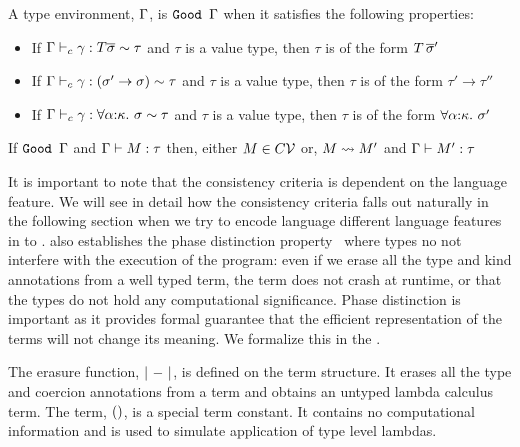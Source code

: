 \documentclass[screen,nonacm,manuscript,review]{acmart} %
\begin{document}
\begin{definition}[$\Good\TEnv$]
 A type environment, $\Gamma$, is $\Good\TEnv$ when it satisfies the
 following properties:
 \begin{itemize}
 \item If $\Gamma \vdash_{c} \gamma : T \overline{\sigma} \sim \tau$ and $\tau$
   is a value type, then $\tau$ is of the form $T\,\overline{\sigma}'$
 \item If $\Gamma \vdash_{c} \gamma : (\sigma' \to \sigma) \sim \tau$ and
   $\tau$ is a value type, then $\tau$ is of the form $\tau' \to \tau''$
 \item If $\Gamma \vdash_{c} \gamma : \forall\alpha{:}\kappa.~\sigma \sim
     \tau$ and $\tau$ is a value type, then $\tau$ is of the form
   $\forall\alpha{:}\kappa.~\sigma'$
 \end{itemize}
\end{definition}

\begin{theorem}\label{thm:progress-sfc}
 If $\Good \TEnv$ and $\Gamma \vdash M : \tau$ then, either $M \in
 C\mathcal{V}$ or, $M \rightsquigarrow M'$ and $\Gamma \vdash M' : \tau$
\end{theorem}

It is important to note that the consistency criteria is
dependent on the language feature. We will see in detail
how the consistency criteria falls out naturally in the following
section when we try to encode language different language features in to
\SFC.  also establishes the phase distinction
property~\cite{harper_higher-order_1989} where types no not
interfere with the execution of the program: even if we erase all the
type and kind annotations from a well typed term, the term does not
crash at runtime, or that the types do not hold any computational
significance. Phase distinction is important as it provides formal
guarantee that the efficient representation of the terms will not
change its meaning. We formalize this in the
.


The erasure function, $|~{-}~|$, is defined on the term structure.
It erases all the type and coercion annotations from a \SFC term and
obtains an untyped lambda calculus term. The term, $()$, is a
special term constant. It contains no computational information and is
used to simulate application of type level lambdas.
\end{document}

